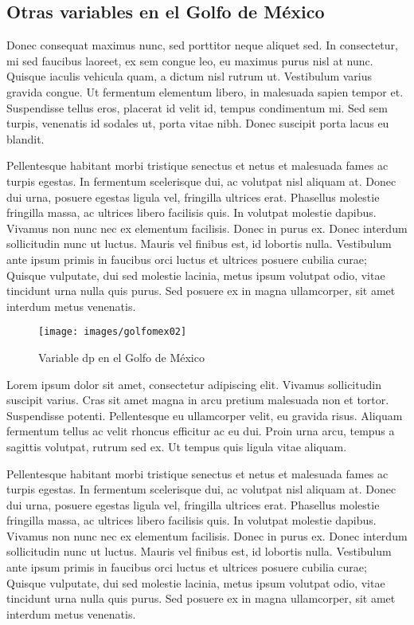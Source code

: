 \documentclass[
]{article}
\begin{document}
\hypertarget{otras-variables-en-el-golfo-de-muxe9xico}{%
\subsection{Otras variables en el Golfo de México}\label{otras-variables-en-el-golfo-de-muxe9xico}}

Donec consequat maximus nunc, sed porttitor neque aliquet sed. In consectetur, mi sed faucibus laoreet, ex sem congue leo, eu maximus purus nisl at nunc. Quisque iaculis vehicula quam, a dictum nisl rutrum ut. Vestibulum varius gravida congue. Ut fermentum elementum libero, in malesuada sapien tempor et. Suspendisse tellus eros, placerat id velit id, tempus condimentum mi. Sed sem turpis, venenatis id sodales ut, porta vitae nibh. Donec suscipit porta lacus eu blandit.

Pellentesque habitant morbi tristique senectus et netus et malesuada fames ac turpis egestas. In fermentum scelerisque dui, ac volutpat nisl aliquam at. Donec dui urna, posuere egestas ligula vel, fringilla ultrices erat. Phasellus molestie fringilla massa, ac ultrices libero facilisis quis. In volutpat molestie dapibus. Vivamus non nunc nec ex elementum facilisis. Donec in purus ex. Donec interdum sollicitudin nunc ut luctus. Mauris vel finibus est, id lobortis nulla. Vestibulum ante ipsum primis in faucibus orci luctus et ultrices posuere cubilia curae; Quisque vulputate, dui sed molestie lacinia, metus ipsum volutpat odio, vitae tincidunt urna nulla quis purus. Sed posuere ex in magna ullamcorper, sit amet interdum metus venenatis.

\begin{figure}
\texttt{[image: images/golfomex02]} \caption{Variable dp en el Golfo de México}\label{fig:Mapa04}
\end{figure}

Lorem ipsum dolor sit amet, consectetur adipiscing elit. Vivamus sollicitudin suscipit varius. Cras sit amet magna in arcu pretium malesuada non et tortor. Suspendisse potenti. Pellentesque eu ullamcorper velit, eu gravida risus. Aliquam fermentum tellus ac velit rhoncus efficitur ac eu dui. Proin urna arcu, tempus a sagittis volutpat, rutrum sed ex. Ut tempus quis ligula vitae aliquam.

Pellentesque habitant morbi tristique senectus et netus et malesuada fames ac turpis egestas. In fermentum scelerisque dui, ac volutpat nisl aliquam at. Donec dui urna, posuere egestas ligula vel, fringilla ultrices erat. Phasellus molestie fringilla massa, ac ultrices libero facilisis quis. In volutpat molestie dapibus. Vivamus non nunc nec ex elementum facilisis. Donec in purus ex. Donec interdum sollicitudin nunc ut luctus. Mauris vel finibus est, id lobortis nulla. Vestibulum ante ipsum primis in faucibus orci luctus et ultrices posuere cubilia curae; Quisque vulputate, dui sed molestie lacinia, metus ipsum volutpat odio, vitae tincidunt urna nulla quis purus. Sed posuere ex in magna ullamcorper, sit amet interdum metus venenatis.
\end{document}
